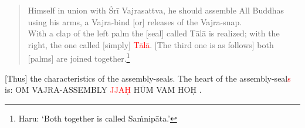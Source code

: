 \documentclass[11pt]{book}
\makeatletter
\def\fakesc#1{%
  \begingroup%
  \xdef\fake@name{\csname\curr@fontshape/\f@size\endcsname}%
  \fontsize{1.3\fontdimen8\fake@name}{\baselineskip}\selectfont%
  \uppercase{#1}%
  \endgroup%
}
\newcommand{\mantra}[1]{\fakesc{#1}}
\newcommand{\red}[1]{\textcolor{red}{#1}}
\makeatother
\begin{document}

\begin{verse}
Himself in union with Śrī Vajrasattva, he should assemble All Buddhas using his arms, a Vajra-bind [or] releases of the Vajra-snap.\\
With a clap of the left palm the [seal] called Tālā is realized; with the right, the one called [simply] \red{Tālā}. [The third one is as follows] both [palms] are joined together.\footnote{Haru: `Both together is called Saṁnipāta.'}
\end{verse}

[Thus] the characteristics of the assembly-seals. The heart of the assembly-seal\red{s} is: \mantra{oṁ Vajra-Assembly \red{jjaḥ} hūṁ vaṁ hoḥ}.
\end{document}
